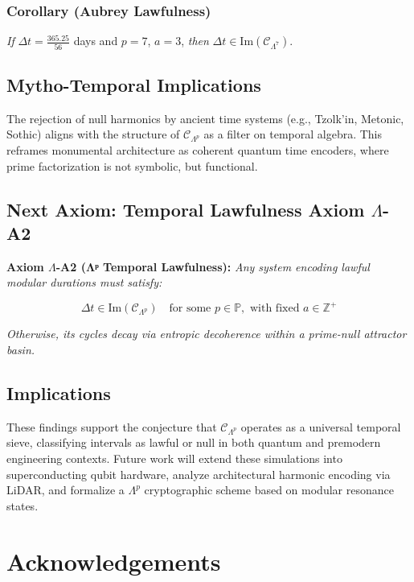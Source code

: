 \documentclass[12]{amsart}
\theoremstyle{plain}
\begin{document}
\subsubsection*{Corollary (Aubrey Lawfulness)}

\textit{If} $\Delta t = \frac{365.25}{56}$ days and $p = 7$, $a = 3$, \textit{then} $\Delta t \in \text{Im}(\mathcal{C}_{\Lambda^7})$.

\subsection{Mytho-Temporal Implications}

The rejection of null harmonics by ancient time systems (e.g., Tzolk’in, Metonic, Sothic) aligns with the structure of $\mathcal{C}_{\Lambda^p}$ as a filter on temporal algebra. This reframes monumental architecture as coherent quantum time encoders, where prime factorization is not symbolic, but functional.

\subsection{Next Axiom: Temporal Lawfulness Axiom $\Lambda$-A2}

\textbf{Axiom $\Lambda$-A2 (Λᵖ Temporal Lawfulness):}
\textit{Any system encoding lawful modular durations must satisfy:}

\[
\Delta t \in \text{Im}(\mathcal{C}_{\Lambda^p}) \quad \text{for some } p \in \mathbb{P}, \text{ with fixed } a \in \mathbb{Z}^+
\]

\textit{Otherwise, its cycles decay via entropic decoherence within a prime-null attractor basin.}

\subsection{Implications}

These findings support the conjecture that $\mathcal{C}_{\Lambda^p}$ operates as a universal temporal sieve, classifying intervals as lawful or null in both quantum and premodern engineering contexts. Future work will extend these simulations into superconducting qubit hardware, analyze architectural harmonic encoding via LiDAR, and formalize a $\Lambda^p$ cryptographic scheme based on modular resonance states.


\section*{Acknowledgements}
\end{document}
